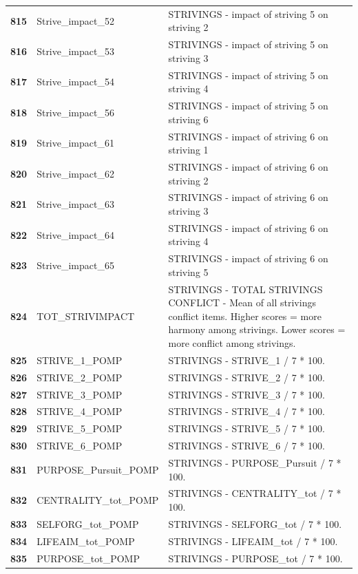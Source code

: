 \documentclass[
  letterpaper,
  DIV=11,
  numbers=noendperiod]{scrartcl}
\begin{document}
\begin{longtable}[t]{>{}cll}
\textbf{815} & Strive\_impact\_52 & STRIVINGS - impact of striving 5 on striving 2\\
\addlinespace
\textbf{816} & Strive\_impact\_53 & STRIVINGS - impact of striving 5 on striving 3\\
\textbf{817} & Strive\_impact\_54 & STRIVINGS - impact of striving 5 on striving 4\\
\textbf{818} & Strive\_impact\_56 & STRIVINGS - impact of striving 5 on striving 6\\
\textbf{819} & Strive\_impact\_61 & STRIVINGS - impact of striving 6 on striving 1\\
\textbf{820} & Strive\_impact\_62 & STRIVINGS - impact of striving 6 on striving 2\\
\addlinespace
\textbf{821} & Strive\_impact\_63 & STRIVINGS - impact of striving 6 on striving 3\\
\textbf{822} & Strive\_impact\_64 & STRIVINGS - impact of striving 6 on striving 4\\
\textbf{823} & Strive\_impact\_65 & STRIVINGS - impact of striving 6 on striving 5\\
\textbf{824} & TOT\_STRIVIMPACT & STRIVINGS - TOTAL STRIVINGS CONFLICT - Mean of all strivings conflict items. Higher scores = more harmony among strivings. Lower scores = more conflict among strivings.\\
\textbf{825} & STRIVE\_1\_POMP & STRIVINGS - STRIVE\_1 / 7 * 100.\\
\addlinespace
\textbf{826} & STRIVE\_2\_POMP & STRIVINGS - STRIVE\_2 / 7 * 100.\\
\textbf{827} & STRIVE\_3\_POMP & STRIVINGS - STRIVE\_3 / 7 * 100.\\
\textbf{828} & STRIVE\_4\_POMP & STRIVINGS - STRIVE\_4 / 7 * 100.\\
\textbf{829} & STRIVE\_5\_POMP & STRIVINGS - STRIVE\_5 / 7 * 100.\\
\textbf{830} & STRIVE\_6\_POMP & STRIVINGS - STRIVE\_6 / 7 * 100.\\
\addlinespace
\textbf{831} & PURPOSE\_Pursuit\_POMP & STRIVINGS - PURPOSE\_Pursuit / 7 * 100.\\
\textbf{832} & CENTRALITY\_tot\_POMP & STRIVINGS - CENTRALITY\_tot / 7 * 100.\\
\textbf{833} & SELFORG\_tot\_POMP & STRIVINGS - SELFORG\_tot / 7 * 100.\\
\textbf{834} & LIFEAIM\_tot\_POMP & STRIVINGS - LIFEAIM\_tot / 7 * 100.\\
\textbf{835} & PURPOSE\_tot\_POMP & STRIVINGS - PURPOSE\_tot / 7 * 100.\\

\end{longtable}
\end{document}
